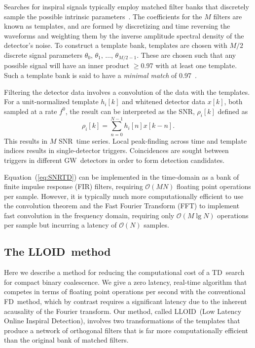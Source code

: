 \documentclass[preprint2]{aastex}
\newcommand{\GW}{GW}%
\newcommand{\SNR}{SNR}%
\newcommand{\tmpsamps}{\ensuremath{N}}
\newcommand{\numtmps}{\ensuremath{M}}
\newcommand{\fir}{FIR}%
\newcommand{\fft}{FFT}%
\newcommand{\lloid}{LLOID}%
\newcommand{\TD}{TD}%
\newcommand{\FD}{FD}%
\begin{document}
Searches for inspiral signals typically employ matched filter
banks that discretely sample the possible intrinsic parameters~\citep{findchirppaper}.
The coefficients for the $\numtmps$ filters are known as templates, 
and are formed by discretizing and time reversing the
waveforms and weighting them by the inverse amplitude spectral density of the
detector's noise.
To construct a template bank, templates are chosen with
$\numtmps/2$ discrete signal parameters $\theta_0,\, \theta_1,\, \dots,\,
\theta_{\numtmps/2-1}$. These are chosen such that any possible signal
will have an inner product $\geqslant$0.97 with at least one template.
Such a template bank is said to have a {\em minimal match} of 0.97~\citep{Owen:1998dk}.

Filtering the detector data involves a convolution of the data with the
templates.  For a unit-normalized template $h_i[k]$ and whitened detector data
$x[k]$, both sampled at a rate $f^0$, the result can be interpreted as the
\SNR, $\rho_i[k]$ defined as
%
%
\begin{equation}
	\label{eq:SNRTD}
	\rho_i [k] = \sum_{n=0}^{N-1} h_{i}[n] x [k-n].
\end{equation}
This results in $\numtmps$ \SNR\ time series. Local peak-finding across time and
template indices results in single-detector triggers.  Coincidences are sought
between triggers in different \GW\ detectors in order to form detection candidates.

Equation~(\ref{eq:SNRTD}) can be implemented in the time-domain as a bank of
finite impulse response (\fir) filters, requiring $\mathcal O(\numtmps
\tmpsamps)$ floating point operations per sample.  However, it is typically
much more computationally efficient to use the convolution theorem and the
Fast Fourier Transform (\fft) to implement fast convolution in the frequency
domain, requiring only
$\mathcal O(\numtmps \lg \tmpsamps)$ operations per sample but incurring
a latency of $\mathcal O(\tmpsamps)$ samples.


\subsection{The \lloid\ method}

Here we describe a method for reducing the computational cost of a \TD\ search
for compact binary coalescence.  We give a zero latency, real-time algorithm
that competes in terms of floating point operations per second with the
conventional \FD\ method, which by contrast requires a significant latency due
to the inherent acausality of the Fourier transform.  Our method, called \lloid\
(Low Latency Online Inspiral Detection), involves two transformations of the
templates that produce a network of orthogonal filters that is far more
computationally efficient than the original bank of matched filters.
\end{document}

